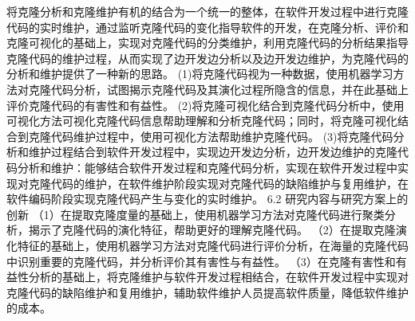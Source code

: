 




将克隆分析和克隆维护有机的结合为一个统一的整体，在软件开发过程中进行克隆代码的实时维护，通过监听克隆代码的变化指导软件的开发，在克隆分析、评价和克隆可视化的基础上，实现对克隆代码的分类维护，利用克隆代码的分析结果指导克隆代码的维护过程，从而实现了边开发边分析以及边开发边维护，为克隆代码的分析和维护提供了一种新的思路。
(1)将克隆代码视为一种数据，使用机器学习方法对克隆代码分析，试图揭示克隆代码及其演化过程所隐含的信息，并在此基础上评价克隆代码的有害性和有益性。
(2)将克隆可视化结合到克隆代码分析中，使用可视化方法可视化克隆代码信息帮助理解和分析克隆代码；同时，将克隆可视化结合到克隆代码维护过程中，使用可视化方法帮助维护克隆代码。
(3)将克隆代码分析和维护过程结合到软件开发过程中，实现边开发边分析，边开发边维护的克隆代码分析和维护：能够结合软件开发过程和克隆代码分析，实现在软件开发过程中实现对克隆代码的维护，在软件维护阶段实现对克隆代码的缺陷维护与复用维护，在软件编码阶段实现克隆代码产生与变化的实时维护。
6.2 研究内容与研究方案上的创新
（1）在提取克隆度量的基础上，使用机器学习方法对克隆代码进行聚类分析，揭示了克隆代码的演化特征，帮助更好的理解克隆代码。
（2）在提取克隆演化特征的基础上，使用机器学习方法对克隆代码进行评价分析，在海量的克隆代码中识别重要的克隆代码，并分析评价其有害性与有益性。
（3）在克隆有害性和有益性分析的基础上，将克隆维护与软件开发过程相结合，在软件开发过程中实现对克隆代码的缺陷维护和复用维护，辅助软件维护人员提高软件质量，降低软件维护的成本。
